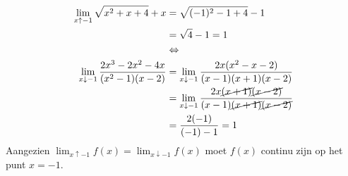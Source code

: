 \documentclass{article}
\begin{document}
\begin{enumerate}
\begin{enumerate}[label=\alph*)]
\begin{align*}
                \lim_{x \uparrow -1} \sqrt{x^2+x+4}+x &= \sqrt{(-1)^2-1+4}-1 \\
                &= \sqrt{4} - 1 = 1 \\
                &\Leftrightarrow \\
                \lim_{x \downarrow -1} \frac{2x^3-2x^2-4x}{(x^2-1)(x-2)} &= \lim_{x \downarrow -1} \frac{2x(x^2-x-2)}{(x-1)(x+1)(x-2)} \\
                &= \lim_{x \downarrow -1} \frac{2x\cancel{(x+1)}\cancel{(x-2)}}{(x-1)\cancel{(x+1)}\cancel{(x-2)}} \\
                &= \frac{2(-1)}{(-1)-1} = 1
            \end{align*}
            Aangezien $\lim_{x \uparrow -1} f(x) = \lim_{x \downarrow -1} f(x)$ moet $f(x)$ continu zijn op het punt $x=-1$.
                

    \end{enumerate}
\end{enumerate}
\end{document}
